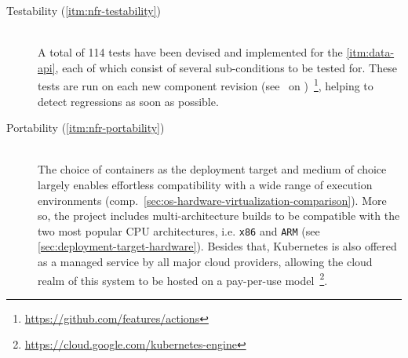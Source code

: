 \begin{description}
  \item[Testability (\ref{itm:nfr-testability})]
  \hfill \\
  A total of 114 tests have been devised and implemented for the \ref{itm:data-api}, each of which consist of several sub-conditions to be tested for. These tests are run on each new component revision (see~ on )~\footnote{\url{https://github.com/features/actions}}, helping to detect regressions as soon as possible.
  
  \item[Portability (\ref{itm:nfr-portability})]
  \hfill \\
  The choice of containers as the deployment target and medium of choice largely enables effortless compatibility with a wide range of execution environments (comp.~\autoref{sec:os-hardware-virtualization-comparison}). More so, the project includes multi-architecture builds to be compatible with the two most popular \acs{CPU} architectures, i.e. \texttt{x86} and \texttt{ARM} (see \autoref{sec:deployment-target-hardware}). Besides that, Kubernetes is also offered as a managed service by all major cloud providers, allowing the cloud realm of this system to be hosted on a pay-per-use model~\footnote{\url{https://cloud.google.com/kubernetes-engine}}.
\end{description}
